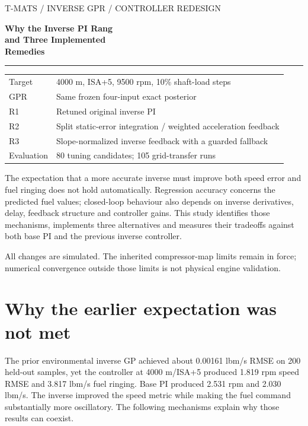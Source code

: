 \documentclass[11pt,a4paper]{article}
\begin{document}
\begin{titlepage}\color{navy}\sffamily
{\small T-MATS / INVERSE GPR / CONTROLLER REDESIGN}\par\vspace{20mm}
{\fontsize{29}{35}\selectfont\bfseries Why the Inverse PI Rang\\and Three Implemented\\Remedies\par}
\vspace{10mm}{\Large Diagnosis, joint-objective tuning,\\and frozen-parameter environmental transfer\par}
\vspace{10mm}\color{teal}\rule{\linewidth}{1.2pt}\color{navy}\vspace{10mm}
\begin{tabular}{@{}ll}
Target & 4000 m, ISA+5, 9500 rpm, 10\% shaft-load steps\\[5pt]
GPR & Same frozen four-input exact posterior\\[5pt]
R1 & Retuned original inverse PI\\[5pt]
R2 & Split static-error integration / weighted acceleration feedback\\[5pt]
R3 & Slope-normalized inverse feedback with a guarded fallback\\[5pt]
Evaluation & 80 tuning candidates; 105 grid-transfer runs
\end{tabular}
\par\vspace{12mm}\normalfont\color{ink}
The expectation that a more accurate inverse must improve both speed error and fuel ringing does not hold automatically. Regression accuracy concerns the predicted fuel values; closed-loop behaviour also depends on inverse derivatives, delay, feedback structure and controller gains. This study identifies those mechanisms, implements three alternatives and measures their tradeoffs against both base PI and the previous inverse controller.

\vfill All changes are simulated. The inherited compressor-map limits remain in force; numerical convergence outside those limits is not physical engine validation.
\end{titlepage}
\tableofcontents\clearpage

\section{Why the earlier expectation was not met}
The prior environmental inverse GP achieved about 0.00161 lbm/s RMSE on 200 held-out samples, yet the controller at 4000 m/ISA+5 produced 1.819 rpm speed RMSE and 3.817 lbm/s fuel ringing. Base PI produced 2.531 rpm and 2.030 lbm/s. The inverse improved the speed metric while making the fuel command substantially more oscillatory. The following mechanisms explain why those results can coexist.
\end{document}
